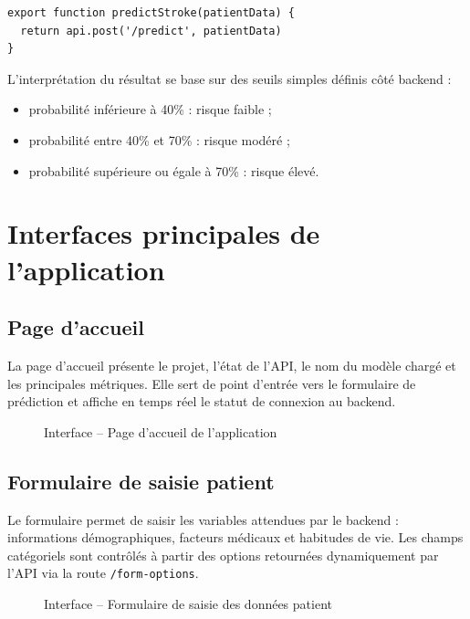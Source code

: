 \documentclass[12pt,a4paper]{report}
\begin{document}
\begin{lstlisting}[caption={Exemple d'appel API côté frontend}]
export function predictStroke(patientData) {
  return api.post('/predict', patientData)
}
\end{lstlisting}

L'interprétation du résultat se base sur des seuils simples définis côté backend :
\begin{itemize}[label=--]
  \item probabilité inférieure à 40\% : risque faible ;
  \item probabilité entre 40\% et 70\% : risque modéré ;
  \item probabilité supérieure ou égale à 70\% : risque élevé.
\end{itemize}

\section{Interfaces principales de l'application}

\subsection{Page d'accueil}
La page d'accueil présente le projet, l'état de l'API, le nom du modèle chargé et les principales métriques. Elle sert de point d'entrée vers le formulaire de prédiction et affiche en temps réel le statut de connexion au backend.

\begin{figure}[H]
\centering
\fbox{\rule{0pt}{6cm}\hspace{12cm}}
\caption{Interface -- Page d'accueil de l'application}
\label{fig:interface_home}
\end{figure}

\subsection{Formulaire de saisie patient}
Le formulaire permet de saisir les variables attendues par le backend : informations démographiques, facteurs médicaux et habitudes de vie. Les champs catégoriels sont contrôlés à partir des options retournées dynamiquement par l'API via la route \texttt{/form-options}.

\begin{figure}[H]
\centering
\fbox{\rule{0pt}{7cm}\hspace{12cm}}
\caption{Interface -- Formulaire de saisie des données patient}
\label{fig:interface_form}
\end{figure}
\end{document}
